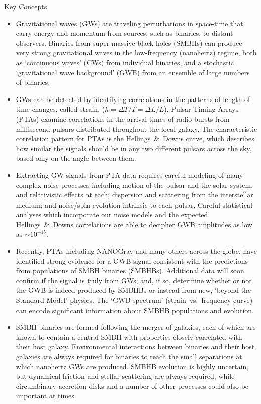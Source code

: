 \documentclass[onecolumn,authoryear]{els-mrw}
\begin{document}

\begin{BoxTypeA}{Key Concepts}
\begin{itemize}
    \item Gravitational waves (GWs) are traveling perturbations in space-time that carry energy and momentum from sources, such as binaries, to distant observers.  Binaries from super-massive black-holes (SMBHs) can produce very strong gravitational waves in the low-frequency (nanohertz) regime, both as `continuous waves' (CWs) from individual binaries, and a stochastic `gravitational wave background' (GWB) from an ensemble of large numbers of binaries.
    \item GWs can be detected by identifying correlations in the patterns of length of time changes, called strain, ($h = \Delta T / T = \Delta L / L$).  Pulsar Timing Arrays (PTAs) examine correlations in the arrival times of radio bursts from millisecond pulsars distributed throughout the local galaxy.  The characteristic correlation pattern for PTAs is the Hellings~\&~Downs curve, which describes how similar the signals should be in any two different pulsars across the sky, based only on the angle between them.
    \item Extracting GW signals from PTA data requires careful modeling of many complex noise processes including motion of the pulsar and the solar system, and relativistic effects at each; dispersion and scattering from the interstellar medium; and noise/spin-evolution intrinsic to each pulsar.  Careful statistical analyses which incorporate our noise models and the expected Hellings~\&~Downs correlations are able to decipher GWB amplitudes as low as $\sim 10^{-15}$.
    \item Recently, PTAs including NANOGrav and many others across the globe, have identified strong evidence for a GWB signal consistent with the predictions from populations of SMBH binaries (SMBHBs).  Additional data will soon confirm if the signal is truly from GWs; and, if so, determine whether or not the GWB is indeed produced by SMBHBs or instead from new, `beyond the Standard Model' physics.  The `GWB spectrum' (strain~vs.~frequency curve) can encode significant information about SMBHB populations and evolution.
    \item SMBH binaries are formed following the merger of galaxies, each of which are known to contain a central SMBH with properties closely correlated with their host galaxy.  Environmental interactions between binaries and their host galaxies are always required for binaries to reach the small separations at which nanohertz GWs are produced.  SMBHB evolution is highly uncertain, but dynamical friction and stellar scattering are always required, while circumbinary accretion disks and a number of other processes could also be important at times.

\end{itemize}
\end{BoxTypeA}
\end{document}
